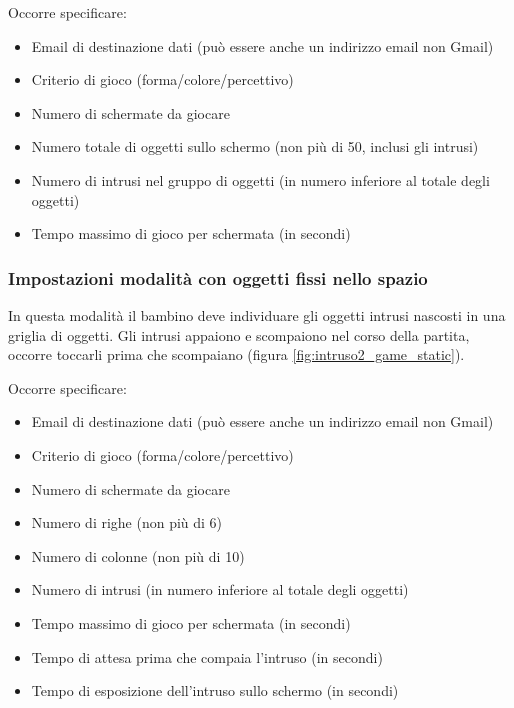 
Occorre specificare:

\begin{itemize}
\item Email di destinazione dati (può essere anche un indirizzo email non Gmail)
\item Criterio di gioco (forma/colore/percettivo)
\item Numero di schermate da giocare
\item Numero totale di oggetti sullo schermo (non più di 50, inclusi gli intrusi)
\item Numero di intrusi nel gruppo di oggetti (in numero inferiore al totale degli oggetti)
\item Tempo massimo di gioco per schermata (in secondi)
\end{itemize}

\subsubsection{Impostazioni modalità con oggetti fissi nello spazio}
In questa modalità il bambino deve individuare gli oggetti intrusi nascosti in una griglia di oggetti. Gli intrusi appaiono e scompaiono nel corso della partita, occorre toccarli prima che scompaiano (figura \ref{fig:intruso2_game_static}).


Occorre specificare:

\begin{itemize}
\item Email di destinazione dati (può essere anche un indirizzo email non Gmail)
\item Criterio di gioco (forma/colore/percettivo)
\item Numero di schermate da giocare
\item Numero di righe (non più di 6)
\item Numero di colonne (non più di 10)
\item Numero di intrusi (in numero inferiore al totale degli oggetti)
\item Tempo massimo di gioco per schermata (in secondi)
\item Tempo di attesa prima che compaia l'intruso (in secondi)
\item Tempo di esposizione dell'intruso sullo schermo (in secondi)
\end{itemize}
